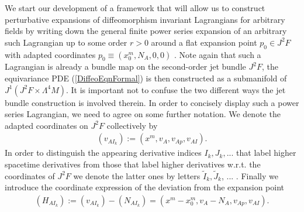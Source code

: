 We start our development of a framework that will allow us to construct perturbative expansions of diffeomorphism invariant Lagrangians for arbitrary fields by writing down the general finite power series expansion of an arbitrary such Lagrangian up to some order $r > 0$ around a flat expansion point $p_0 \in J^2F$ with adapted coordinates $p_0 \equiv (x_0^m,N_A, 0, 0)$ . Note again that such a Lagrangian is already a bundle map on the second-order jet bundle $J^2F$, the equivariance PDE (\ref{DiffeoEqnFormal}) is then constructed as a submanifold of $J^1(J^2F \times \Lambda^4M)$. It is important not to confuse the two different ways the jet bundle construction is involved therein. In order to concisely display such a power series Lagrangian, we need to agree on some further notation. We denote the adapted coordinates on $J^2F$ collectively by
\begin{align}
    (v_{AI_k}) := (x^m,v_A,v_{Ap},v_{AI}).
\end{align}
In order to distinguish the appearing derivative indices $I_k,J_k,...$ that label higher spacetime derivatives from those that label higher derivatives w.r.t. the coordinates of $J^2F$ we denote the latter ones by letters
$\tilde{I}_k, \tilde{J}_k$, ... . Finally we introduce the coordinate expression of the deviation from the expansion point 
\begin{align}
    (H_{AI_k}) := (v_{AI_k}) - (N_{AI_k}) = (x^m-x_0^m,v_A-N_A,v_{Ap},v_{AI}).
\end{align}

